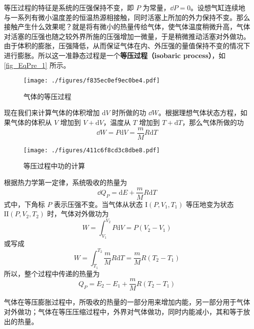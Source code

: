 

等压过程的特征是系统的压强保持不变，即 $P$ 为常量，$\dd P =0$。设想气缸连续地与一系列有微小温度差的恒温热源相接触，同时活塞上所加的外力保持不变。那么接触产生什么效果呢？就是将有微小的热量传给气体，使气体温度稍微升高，气体对活塞的压强也随之较外界所施的压强增加一微量，于是稍微推动活塞对外做功。由于体积的膨胀，压强降低，从而保证气体在内、外压强的量值保持不变的情况下进行膨胀。所以这一准静态过程是一个\textbf{等压过程（isobaric process）}，如\autoref{fig_EqPre_1} 所示。
\begin{figure}[ht]
\centering
\texttt{[image: ./figures/f835ec0ef9ec0be4.pdf]}
\caption{气体的等压过程} \label{fig_EqPre_1}
\end{figure}
现在我们来计算气体的体积增加 $\mathrm d V $ 时所做的功 $\dd W$。根据理想气体状态方程，如果气体的体积从 $V $ 增加到 $V+\mathrm dV$，温度从 $T $ 增加到 $T+\mathrm dT$，那么气体所做的功
\begin{equation}
\dd W=P \mathrm{d} V=\frac{m}{M} R \mathrm{d} T
\end{equation}
\begin{figure}[ht]
\centering
\texttt{[image: ./figures/411c6f8cd3c8dbe8.pdf]}
\caption{等压过程中功的计算} \label{fig_EqPre_2}
\end{figure}
根据热力学第一定律，系统吸收的热量为
\begin{equation}
\dd Q_{P}=\mathrm{d} E+\frac{m}{M} R \mathrm{d} T
\end{equation}
式中，下角标 $P$ 表示压强不变。当气体从状态 $\mathrm I(P, V_1, T_1)$ 等压地变为状态 $\mathrm{II}(P, V_2,T_2)$ 时，气体对外做功为
\begin{equation}
W=\int_{V_{1}}^{V_{2}} P \mathrm{d} V=P\left(V_{2}-V_{1}\right)
\end{equation}
或写成
\begin{equation}
W=\int_{T_{1}}^{T_{2}} \frac{m}{M} R \mathrm{d} T=\frac{m}{M} R\left(T_{2}-T_{1}\right)
\end{equation}
所以，整个过程中传递的热量为
\begin{equation}
Q_{P}=E_{2}-E_{1}+\frac{m}{M} R\left(T_{2}-T_{1}\right)
\end{equation}

气体在等压膨胀过程中，所吸收的热量的一部分用来增加内能，另一部分用于气体对外做功；气体在等压压缩过程中，外界对气体做功，同时内能减小，其和等于放出的热量。


